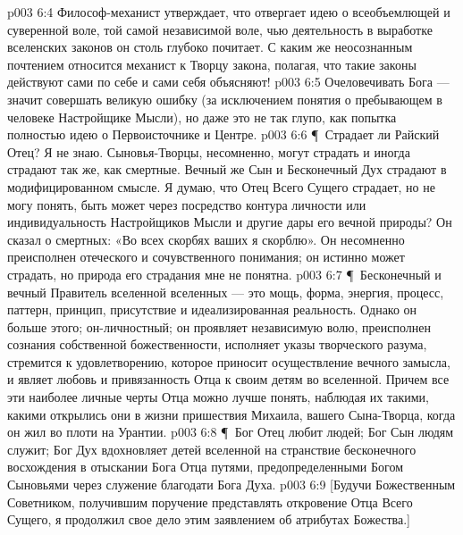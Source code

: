 \vs p003 6:4 Философ\hyp{}механист утверждает, что отвергает идею о всеобъемлющей и суверенной воле, той самой независимой воле, чью деятельность в выработке вселенских законов он столь глубоко почитает. С каким же неосознанным почтением относится механист к Творцу закона, полагая, что такие законы действуют сами по себе и сами себя объясняют!
\vs p003 6:5 Очеловечивать Бога --- значит совершать великую ошибку (за исключением понятия о пребывающем в человеке Настройщике Мысли), но даже это не так глупо, как попытка полностью  идею о Первоисточнике и Центре.
\vs p003 6:6 \P\ Страдает ли Райский Отец? Я не знаю. Сыновья\hyp{}Творцы, несомненно, могут страдать и иногда страдают так же, как смертные. Вечный же Сын и Бесконечный Дух страдают в модифицированном смысле. Я думаю, что Отец Всего Сущего страдает, но не могу понять,  быть может через посредство контура личности или индивидуальность Настройщиков Мысли и другие дары его вечной природы? Он сказал о смертных: «Во всех скорбях ваших я скорблю». Он несомненно преисполнен отеческого и сочувственного понимания; он истинно может страдать, но природа его страдания мне не понятна.
\vs p003 6:7 \P\ Бесконечный и вечный Правитель вселенной вселенных --- это мощь, форма, энергия, процесс, паттерн, принцип, присутствие и идеализированная реальность. Однако он больше этого; он\hyp{}личностный; он проявляет независимую волю, преисполнен сознания собственной божественности, исполняет указы творческого разума, стремится к удовлетворению, которое приносит осуществление вечного замысла, и являет любовь и привязанность Отца к своим детям во вселенной. Причем все эти наиболее личные черты Отца можно лучше понять, наблюдая их такими, какими открылись они в жизни пришествия Михаила, вашего Сына\hyp{}Творца, когда он жил во плоти на Урантии.
\vs p003 6:8 \P\ Бог Отец любит людей; Бог Сын людям служит; Бог Дух вдохновляет детей вселенной на странствие бесконечного восхождения в отыскании Бога Отца путями, предопределенными Богом Сыновьями через служение благодати Бога Духа.
\vs p003 6:9 [Будучи Божественным Советником, получившим поручение представлять откровение Отца Всего Сущего, я продолжил свое дело этим заявлением об атрибутах Божества.]
